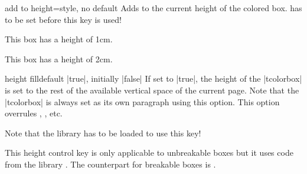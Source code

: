 \clearpage

\begin{docTcbKey}[][doc new=2014-11-07]{add to height}{=}{style, no default}
  Adds  to the current height of the colored box.
   has to be set before this key is used!
\begin{dispExample}

\begin{tcolorbox}
  This box has a height of 1cm.
\end{tcolorbox}
\begin{tcolorbox}[add to height=1cm]
  This box has a height of 2cm.
\end{tcolorbox}
\end{dispExample}
\end{docTcbKey}


\begin{docTcbKey}[][doc new=2014-09-22]{height fill}{}{default |true|, initially |false|}
If set to |true|, the height of the |tcolorbox| is set to the rest of the
available vertical space of the current page. Note that the |tcolorbox|
is always set as its own paragraph using this option.
This option overrules , , etc.
\begin{marker}
Note that the library  has to be loaded to use this key!
\end{marker}
This height control key is only applicable to unbreakable boxes but it
uses code from the library .
The counterpart for breakable boxes is .

\begin{dispListing}
\begin{tcolorbox}[height fill,
  colback=red!5!white,colframe=red!75!black,fonttitle=\bfseries,
  title=Box which fills the rest of the page]
\lipsum[1]
\end{tcolorbox}
\end{dispListing}
\end{docTcbKey}
{\tcbusetemp}

